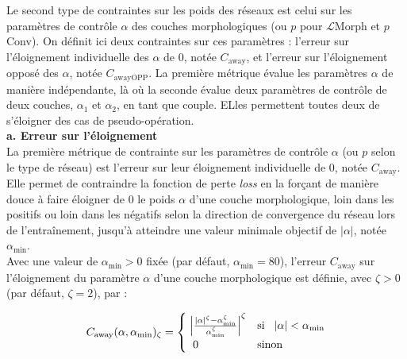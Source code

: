 Le second type de contraintes sur les poids des réseaux est celui sur les paramètres de contrôle $\alpha$ des couches morphologiques (ou $p$ pour $\mathcal{L}$Morph et $p$Conv). On définit ici deux contraintes sur ces paramètres : l’erreur sur l'éloignement individuelle des $\alpha$ de $0$, notée $C_\text{away}$, et l’erreur sur l'éloignement opposé des $\alpha$, notée $C_\text{awayOPP}$. La première métrique évalue les paramètres $\alpha$ de manière indépendante, là où la seconde évalue deux paramètres de contrôle de deux couches, $\alpha_1$ et $\alpha_2$, en tant que couple. ELles permettent toutes deux de s'éloigner des cas de pseudo-opération. \\



\noindent \textbf{a. Erreur sur l'éloignement}\\

La première métrique de contrainte sur les paramètres de contrôle $\alpha$ (ou $p$ selon le type de réseau) est l'erreur sur leur éloignement individuelle de $0$, notée $C_\text{away}$. Elle permet de contraindre la fonction de perte \textit{loss} en la forçant de manière douce à faire éloigner de $0$ le poids $\alpha$ d'une couche morphologique, loin dans les positifs ou loin dans les négatifs selon la direction de convergence du réseau lors de l'entraînement, jusqu'à atteindre une valeur minimale objectif de $|\alpha|$, notée $\alpha_\text{min}$. \\

\vspace{-1.0mm}
\noindent Avec une valeur de $\alpha_\text{min} > 0$ fixée (par défaut, $\alpha_\text{min} = 80$), l'erreur $C_\text{away}$ sur l'éloignement du paramètre $\alpha$ d'une couche morphologique est définie, avec $\zeta > 0$ (par défaut, $\zeta = 2$), par :

\vspace{-1.0mm}
\begin{equation}
    C_\text{away}(\alpha, \alpha_\text{min})_\zeta = 
    \begin{cases}
        \hspace{1.0mm} \left | 
        \frac{ | \alpha |^\zeta - \alpha_\text{min} ^\zeta }{ \alpha_\text{min} ^\zeta } 
        \right | ^\zeta & \mbox{si} \hspace{3.0mm} | \alpha | < \alpha_\text{min} \\
        \hspace{2.0mm} 0 & \mbox{sinon}
    \end{cases}
    \label{erreur_away}
\end{equation}



